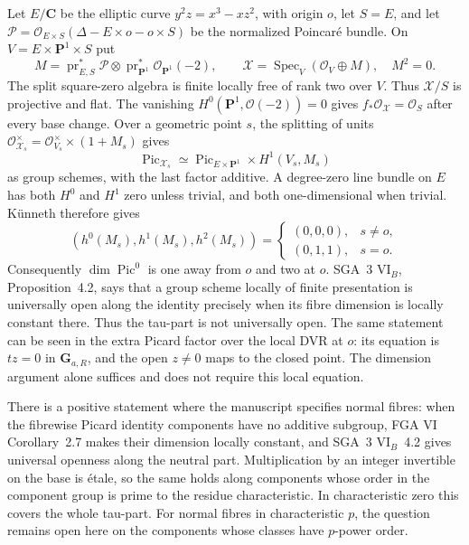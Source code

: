 Let $E/\mathbf C$ be the elliptic curve $y^2z=x^3-xz^2$, with origin $o$, let
$S=E$, and let
$\mathcal P=\mathcal O_{E\times S}(\Delta-E\times o-o\times S)$ be the
normalized Poincar\'e bundle. On $V=E\times\mathbf P^1\times S$ put
\[
 M=\operatorname{pr}_{E,S}^*\mathcal P\otimes
       \operatorname{pr}_{\mathbf P^1}^*\mathcal O_{\mathbf P^1}(-2),
 \qquad \mathcal X=\operatorname{Spec}_V(\mathcal O_V\oplus M),\quad M^2=0.
\]
The split square-zero algebra is finite locally free of rank two over $V$.
Thus $\mathcal X/S$ is projective and flat. The vanishing
$H^0(\mathbf P^1,\mathcal O(-2))=0$ gives
$f_*\mathcal O_{\mathcal X}=\mathcal O_S$ after every base change.
Over a geometric point $s$, the splitting of units
$\mathcal O_{\mathcal X_s}^{\times}=\mathcal O_{V_s}^{\times}\times(1+M_s)$
gives
\[
 \operatorname{Pic}_{\mathcal X_s}
 \simeq\operatorname{Pic}_{E\times\mathbf P^1}\times H^1(V_s,M_s)
\]
as group schemes, with the last factor additive. A degree-zero line bundle
on $E$ has both $H^0$ and $H^1$ zero unless trivial, and both one-dimensional
when trivial. K\"unneth therefore gives
\[
 (h^0(M_s),h^1(M_s),h^2(M_s))=
 \begin{cases}(0,0,0),&s\ne o,\\(0,1,1),&s=o.\end{cases}
\]
Consequently $\dim\operatorname{Pic}^0$ is one away from $o$ and two at $o$.
SGA~3 VI$_B$, Proposition~4.2, says that a group scheme locally of finite
presentation is universally open along the identity precisely when its fibre
dimension is locally constant there. Thus the tau-part is not universally
open. The same statement can be seen in the extra Picard factor over the
local DVR at $o$: its equation is $tz=0$ in $\mathbf G_{a,R}$, and the open
$z\ne0$ maps to the closed point. The dimension argument alone suffices and
does not require this local equation.

There is a positive statement where the manuscript specifies normal fibres:
when the fibrewise Picard identity components have no additive subgroup,
FGA VI Corollary~2.7 makes their dimension locally constant, and SGA~3
VI$_B$~4.2 gives universal openness along the neutral part. Multiplication by
an integer invertible on the base is \'etale, so the same holds along components
whose order in the component group is prime to the residue characteristic.
In characteristic zero this covers the whole tau-part. For normal fibres
in characteristic $p$, the question remains open here on the components
whose classes have $p$-power order.

